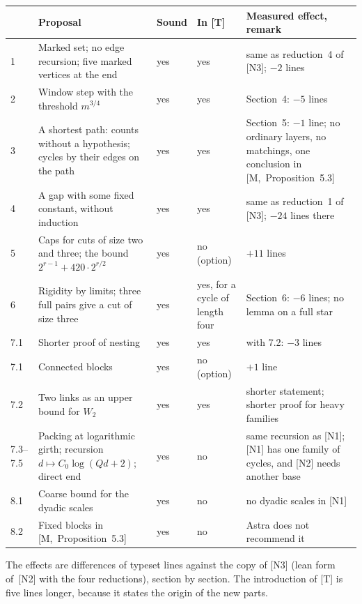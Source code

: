 \documentclass[11pt]{article}
\newcommand{\M}[1]{[M,~#1]}
\begin{document}
\begin{center}\small
\begin{tabular}{@{}p{1.1cm}p{4.6cm}p{1.0cm}p{2.1cm}p{5.0cm}@{}}
\toprule
 & \textsf{\textbf{Proposal}} & \textsf{\textbf{Sound}} & \textsf{\textbf{In [T]}} & \textsf{\textbf{Measured effect, remark}}\\
\midrule
1 & Marked set; no edge recursion; five marked vertices at the end & yes & yes & same as reduction~4 of [N3]; $-2$ lines\\
2 & Window step with the threshold $m^{3/4}$ & yes & yes & Section~4: $-5$ lines\\
3 & A shortest path: counts without a hypothesis; cycles by their edges on the path & yes & yes & Section~5: $-1$ line; no ordinary layers, no matchings, one conclusion in \M{Proposition~5.3}\\
4 & A gap with some fixed constant, without induction & yes & yes & same as reduction~1 of [N3]; $-24$ lines there\\
5 & Caps for cuts of size two and three; the bound $2^{r-1}+420\cdot2^{r/2}$ & yes & no (option) & $+11$ lines\\
6 & Rigidity by limits; three full pairs give a cut of size three & yes & yes, for a cycle of length four & Section~6: $-6$ lines; no lemma on a full star\\
7.1 & Shorter proof of nesting & yes & yes & with 7.2: $-3$ lines\\
7.1 & Connected blocks & yes & no (option) & $+1$ line\\
7.2 & Two links as an upper bound for $W_2$ & yes & yes & shorter statement; shorter proof for heavy families\\
7.3--7.5 & Packing at logarithmic girth; recursion $d\mapsto C_0\log(Qd+2)$; direct end & yes & no & same recursion as [N1]; [N1] has one family of cycles, and [N2] needs another base\\
8.1 & Coarse bound for the dyadic scales & yes & no & no dyadic scales in [N1]\\
8.2 & Fixed blocks in \M{Proposition~5.3} & yes & no & Astra does not recommend it\\
\bottomrule
\end{tabular}
\end{center}

\noindent The effects are differences of typeset lines against the copy of [N3] (lean form
of~[N2] with the four reductions), section by section. The introduction of [T] is five lines
longer, because it states the origin of the new parts.
\end{document}
